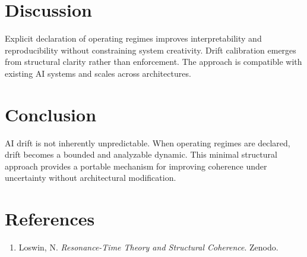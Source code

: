 \documentclass[10pt]{article}
\begin{document}
\section{Discussion}
Explicit declaration of operating regimes improves interpretability and reproducibility without constraining system creativity. Drift calibration emerges from structural clarity rather than enforcement. The approach is compatible with existing AI systems and scales across architectures.

\section{Conclusion}
AI drift is not inherently unpredictable. When operating regimes are declared, drift becomes a bounded and analyzable dynamic. This minimal structural approach provides a portable mechanism for improving coherence under uncertainty without architectural modification.

\section*{References}
\begin{enumerate}
  \item Loswin, N. \emph{Resonance-Time Theory and Structural Coherence}. Zenodo.
\end{enumerate}
\end{document}
